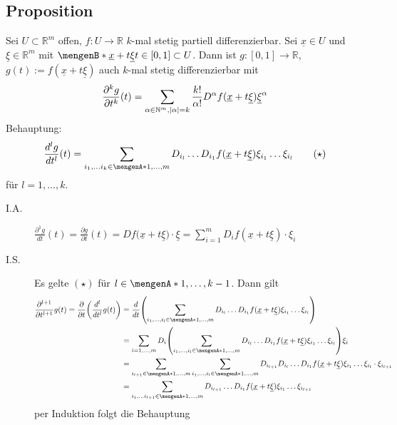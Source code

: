 \subsection{Proposition} %
\label{sub:713}
Sei $U \subset \mathds{R}^m$ offen, $f : U \to \mathds{R}$ $k$-mal stetig partiell differenzierbar. Sei $\underline{x} \in U$ und $\underline{\xi} \in \mathds{R}^m$ mit
$\set[\underline{x} + t \underline{\xi}]{t \in [0,1]} \subset U $. Dann ist $g : [0,1] \to \mathds{R}$, $g(t) := f( \underline{x} + t \underline{\xi})$ auch $k$-mal
stetig differenzierbar mit
\[
	\frac{\partial^k g}{\partial t^k} (t) =   \sum_{\alpha \in \mathds{N}^m, \abs*{\alpha}=k } \frac{k!}{\alpha!} D^\alpha f(\underline{x} + t \underline{\xi}) \underline{\xi}^\alpha  
\]
Behauptung: 
\[
	 \frac{d^l g}{d t^l} (t) = \sum_{i_1, \ldots i_k \in \set{1, \ldots , m} }  D_{i_l} \ldots D_{i_1} f( \underline{x} + t \underline{\xi}) \xi_{i_1} \ldots \xi_{i_l}  
	 \tag{$\star$}
\]
für $l= 1, \ldots , k$.
\begin{description}
	\item[I.A.] $ \frac{\partial^1 g}{d t} (t) = \frac{\partial g}{\partial t} (t)   = D f \big( \underline{x} + t \underline{\xi} \big) \cdot  \underline{\xi}  = \sum_{i=1}^{m} D_i f ( \underline{x} + t \underline{\xi}) \cdot \xi_i$ 
	\item[I.S.] Es gelte $(\star)$ für $l \in \set{1, \ldots , k-1} $. Dann gilt
	\begin{align*}
		\frac{\partial ^{l+1}}{\partial t^{l+1}} g(t) = \frac{\partial }{ \partial t} \enbrace*{\frac{d^l}{d t^l} g(t) } &=  \frac{d}{dt} \enbrace*{\sum_{i_1, \ldots , i_l 
		\in \set{1, \ldots ,m}} D_{i_l} \ldots D_{i_1} f ( \underline{x} + t \underline{\xi} ) \xi_{i_1} \ldots  \xi_{i_l} }  \\
		&= \sum_{i=1, \ldots , m} D_i \enbrace*{\sum_{i_1, \ldots , i_l 
		\in \set{1, \ldots ,m}} D_{i_l} \ldots D_{i_1} f ( \underline{x} + t \underline{\xi} ) \xi_{i_1} \ldots  \xi_{i_l}   } \xi_i \\
		&=  \sum_{i_{l+1} \in \set{1, \ldots , m} } \sum_{i_1, \ldots , i_l \in \set{1, \ldots , m}  }D_{i_{l+1}} D_{i_l} \ldots  D_{i_1} f( \underline{x} + t \underline{\xi}) \xi_{i_1}
		\ldots \xi_{i_l} \cdot \xi_{i_{l+1}} \\
		&=    \sum_{i_1, \ldots i_{l+1} \in \set{1, \ldots , m} } D_{i_{l+1}} \ldots D_{i_1} f(\underline{x} + t \underline{\xi}) \xi_{i_1} \ldots \xi_{i_{l+1}} 
	\end{align*}
	per Induktion folgt die Behauptung
\end{description}
